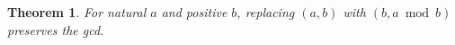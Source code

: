 \documentclass{article}
\newtheorem{theorem}{Theorem}
\begin{document}
\begin{theorem}\label{thm:G04}
For natural $a$ and positive $b$, replacing $(a,b)$ with $(b,a\bmod b)$ preserves the gcd.
\end{theorem}
\end{document}
